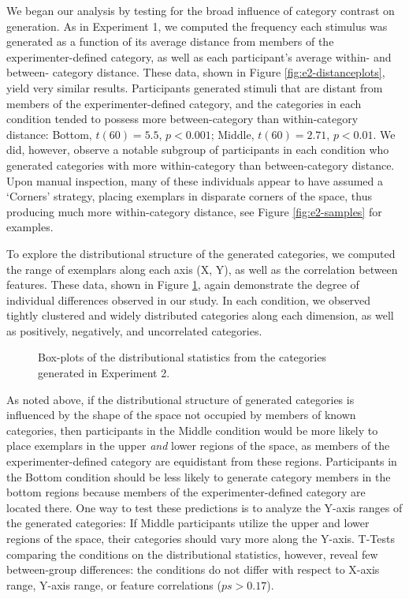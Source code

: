 \documentclass[12pt]{article}
\newcommand\inputpgf[2]{{
\let\pgfimageWithoutPath\pgfimage
\renewcommand{\pgfimage}[2][]{\pgfimageWithoutPath[##1]{#1/##2}}

}}
\begin{document}
\begin{flushleft}
We began our analysis by testing for the broad influence of category contrast on generation. As in Experiment 1, we computed the frequency each stimulus was generated as a function of its average distance from members of the experimenter-defined category, as well as each participant's average within- and between- category distance. These data, shown in Figure \ref{fig:e2-distanceplots}, yield very similar results. Participants generated stimuli that are distant from members of the experimenter-defined category, and the categories in each condition tended to possess more between-category than within-category distance: Bottom, $t(60) = 5.5$, $p < 0.001$; Middle, $t(60) = 2.71$, $p < 0.01$. We did, however, observe a notable subgroup of participants in each condition who generated categories with more within-category than between-category distance. Upon manual inspection, many of these individuals appear to have assumed a `Corners' strategy, placing exemplars in disparate corners of the space, thus producing much more within-category distance, see Figure \ref{fig:e2-samples} for examples.

To explore the distributional structure of the generated categories, we computed the range of exemplars along each axis (X, Y), as well as the correlation between features. These data, shown in Figure \ref{fig:e2-statsboxes}, again demonstrate the degree of individual differences observed in our study. In each condition, we observed tightly clustered and widely distributed categories along each dimension, as well as positively, negatively, and uncorrelated categories. 

\begin{figure}
    \begin{center}
    \inputpgf{figs/}{e2-statsboxes.pgf}
    \caption{Box-plots of the distributional statistics from the categories generated in Experiment 2. }
    \label{fig:e2-statsboxes}
    \end{center}
\end{figure}


As noted above, if the distributional structure of generated categories is influenced by the shape of the space not occupied by members of known categories, then participants in the Middle condition would be more likely to place exemplars in the upper {\em and} lower regions of the space, as members of the experimenter-defined category are equidistant from these regions. Participants in the Bottom condition should be less likely to generate category members in the bottom regions because members of the experimenter-defined category are located there. One way to test these predictions is to analyze the Y-axis ranges of the generated categories: If Middle participants utilize the upper and lower regions of the space, their categories should vary more along the Y-axis. T-Tests comparing the conditions on the distributional statistics, however, reveal few between-group differences: the conditions do not differ with respect to X-axis range, Y-axis range, or feature correlations ($ps>0.17$).


\end{flushleft}
\end{document}
